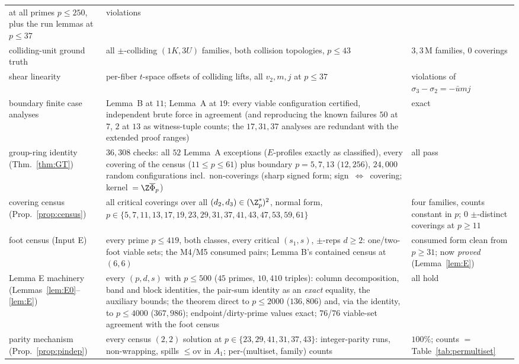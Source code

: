 \begin{longtable}{@{}p{3.7cm}>{\raggedright\arraybackslash}p{8.2cm}>{\raggedright\arraybackslash}p{3.1cm}@{}}
  at all primes $p\le250$, plus the run lemmas at $p\le37$ & 0 violations \\
colliding-unit ground truth & all $\pm$-colliding $(1K,3U)$ families,
  both collision topologies, $p\le43$ & $3{,}3$\,M families, 0 coverings \\
shear linearity & per-fiber $t$-space offsets of colliding lifts,
  all $v_2,m,j$ at $p\le37$ & 0 violations of $\sigma_3-\sigma_2=-\bar u mj$ \\
boundary finite case analyses & Lemma~B at $11$; Lemma~A at $19$: every
  viable configuration certified, independent brute force in
  agreement (and reproducing the known failures $50$ at $7$, $2$ at $13$
  as witness-tuple counts; the $17,31,37$ analyses are redundant with the extended proof ranges) & exact \\
group-ring identity (Thm.~\ref{thm:GT}) & $36{,}308$ checks: all $52$
  Lemma~A exceptions ($E$-profiles exactly as classified), every covering
  of the census ($11\le p\le 61$) plus boundary $p=5,7,13$ ($12{,}256$),
  $24{,}000$ random configurations
  incl.\ non-coverings (sharp signed form; sign~$\Leftrightarrow$~covering;
  kernel~$=\Z\overline\Phi_p$) & all pass \\
covering census (Prop.~\ref{prop:census}) & all critical coverings over
  all $(d_2,d_3)\in(\Z_p^*)^2$, normal form, $p\in\{5,7,11,13,17,19,23,29,31,37,41,43,47,53,59,61\}$
  & four families, counts constant in $p$; $0$ $\pm$-distinct coverings at
  $p\ge11$ \\
foot census (Input E) & every prime $p\le419$, both classes, every
  critical $(s_1,s)$, $\pm$-reps $d\ge2$: one/two-foot viable sets;
  the M4/M5 consumed pairs; Lemma B's contained census at $(6,6)$ &
  consumed form clean from $p\ge31$; now \emph{proved}
  (Lemma~\ref{lem:E}) \\
Lemma E machinery (Lemmas~\ref{lem:E0}--\ref{lem:E}) & every $(p,d,s)$
  with $p\le500$ ($45$ primes, $10{,}410$ triples): column decomposition,
  band and block identities, the pair-sum identity as an \emph{exact}
  equality, the auxiliary bounds; the theorem direct to $p\le2000$
  ($136{,}806$) and, via the identity, to $p\le4000$ ($367{,}986$);
  endpoint/dirty-prime values exact; $76$/$76$ viable-set agreement with
  the foot census & all hold \\
parity mechanism (Prop.~\ref{prop:pindep}) & every census $(2,2)$ solution
  at $p\in\{23,29,41,31,37,43\}$: integer-parity runs, non-wrapping,
  spills $\le\mathrm{ov}$ in $A_1$; per-(multiset, family) counts &
  $100\%$; counts $=$ Table~\ref{tab:permultiset} \\

\end{longtable}
